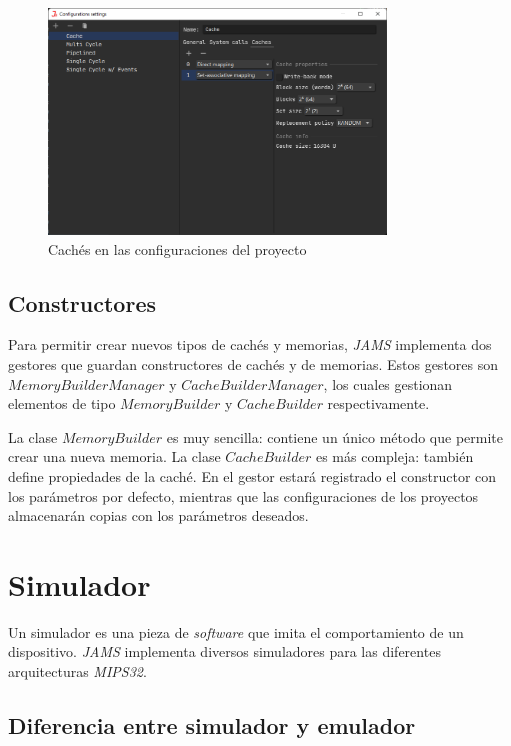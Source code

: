 \begin{figure}[H]
    \centering
    \includegraphics[width=0.8\textwidth]{images/mips/jams-caches}
    \caption{Cachés en las configuraciones del proyecto}
    \label{fig:jams-caches}
\end{figure}

\subsection{Constructores}\label{subsec:constructores}

Para permitir crear nuevos tipos de cachés y memorias,
\textit{JAMS} implementa dos gestores que guardan constructores de cachés
y de memorias.
Estos gestores son $MemoryBuilderManager$ y $CacheBuilderManager$,
los cuales gestionan elementos de tipo
$MemoryBuilder$ y $CacheBuilder$ respectivamente.

\noindent La clase $MemoryBuilder$ es muy sencilla:
contiene un único método que permite crear una nueva memoria.
La clase $CacheBuilder$ es más compleja:
también define propiedades de la caché.
En el gestor estará registrado el constructor con los parámetros por defecto,
mientras que las configuraciones de los proyectos almacenarán copias con los
parámetros deseados.


\section{Simulador}\label{sec:simulador}

Un simulador es una pieza de \textit{software} que imita el comportamiento
de un dispositivo.
\textit{JAMS} implementa diversos simuladores para las diferentes
arquitecturas \textit{MIPS32}.

\subsection{Diferencia entre simulador y emulador}
\label{subsec:diferencia-entre-simulador-y-emulador}

